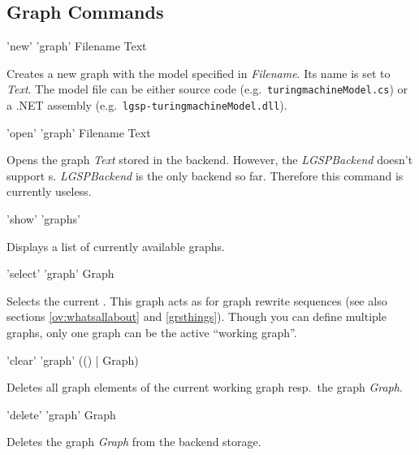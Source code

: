 \subsection{Graph Commands}
\label{graphcommands}

\begin{rail}
  'new' 'graph' Filename Text 
\end{rail}
Creates a new graph with the model specified in \emph{Filename}. Its name is set to \emph{Text}. The model file can be either source code (e.g.\ \texttt{turing\textunderscore machineModel.cs}) or a .NET assembly (e.g.\ \texttt{lgsp-turing\textunderscore machineModel.dll}).

\begin{rail}
  'open' 'graph' Filename Text
\end{rail}
Opens the graph \emph{Text} stored in the backend. However, the \emph{LGSPBackend} doesn't support s. \emph{LGSPBackend} is the only backend so far. Therefore this command is currently useless.

\begin{rail}
  'show' 'graphs'
\end{rail}
Displays a list of currently available graphs.

\begin{rail}
  'select' 'graph' Graph
\end{rail}
Selects the current . This graph acts as \emph{} for graph rewrite sequences (see also sections \ref{ov:whatsallabout} and \ref{grsthings}). Though you can define multiple graphs, only one graph can be the active ``working graph''.

\begin{rail}
  'clear' 'graph' (() | Graph)
\end{rail}
Deletes all graph elements of the current working graph resp.\ the graph \emph{Graph}.

\begin{rail}
  'delete' 'graph' Graph
\end{rail}
Deletes the graph \emph{Graph} from the backend storage.

